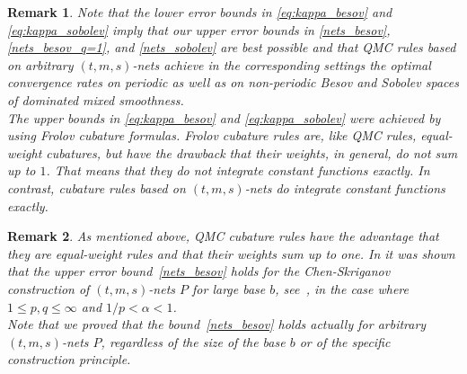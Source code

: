 \documentclass[12pt]{article}
\newtheorem{remark}{Remark}
\begin{document}
\begin{remark}
Note that the lower error bounds in \eqref{eq:kappa_besov} and \eqref{eq:kappa_sobolev}
imply that our upper error bounds in \eqref{nets_besov}, 
\eqref{nets_besov_q=1}, and \eqref{nets_sobolev} are best possible and that QMC rules based on arbitrary $(t,m,s)$-nets achieve in the corresponding settings the optimal convergence rates on periodic as well as on non-periodic Besov and Sobolev spaces of dominated mixed smoothness. \\
The upper bounds in  \eqref{eq:kappa_besov} and \eqref{eq:kappa_sobolev} were achieved by using 
\emph{Frolov cubature formulas}. Frolov cubature rules are, like QMC rules, equal-weight cubatures, but have the drawback that their weights, in general, do not sum up to $1$. That means that they do not integrate constant functions exactly. In contrast, cubature rules based on $(t,m,s)$-nets do integrate constant functions exactly. 
\end{remark}

\begin{remark}\label{Rem:Known_QMC_Int_Disc} 
As mentioned above, QMC cubature rules have the advantage that they are equal-weight rules and that their weights sum up to one. In \cite{Mar13} it was shown that the upper error bound~\eqref{nets_besov} 
holds for the Chen-Skriganov construction of $(t,m,s)$-nets $P$ for large base $b$, see~\cite{CS02, Skr06}, in the case where $1\le p,q \le \infty$ and $1/p < \alpha <1$.  \\
Note that we proved that the bound~\eqref{nets_besov} holds actually for arbitrary $(t,m,s)$-nets $P$, regardless of the size of the base $b$ or of the specific construction principle.
\end{remark}

\end{document}

